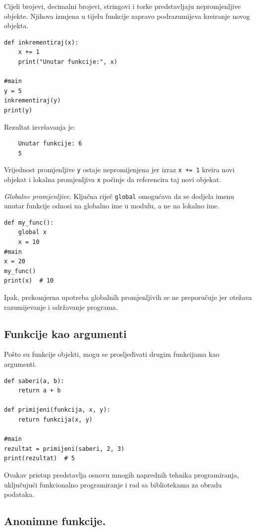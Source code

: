 Cijeli brojevi, decimalni brojevi, stringovi i torke predstavljaju nepromjenljive objekte. Njihova izmjena u tijelu funkcije zapravo podrazumijeva kreiranje novog objekta.

\begin{verbatim}
def inkrementiraj(x):
    x += 1
    print("Unutar funkcije:", x)

#main
y = 5   
inkrementiraj(y)
print(y)
\end{verbatim}

Rezultat izvršavanja je:
\begin{verbatim}
	Unutar funkcije: 6
	5
\end{verbatim}

Vrijednost promjenljive \texttt{y} ostaje nepromijenjena jer izraz \texttt{x += 1} kreira novi objekat i lokalna promjenljiva \texttt{x} počinje da referencira taj novi objekat.

\textit{Globalne promjenljive}. Ključna riječ \texttt{global} omogućava da se dodjela imenu unutar funkcije odnosi na globalno ime u modulu, a ne na lokalno ime. 

\begin{verbatim}
def my_func():
    global x
    x = 10
#main
x = 20
my_func()
print(x)  # 10
\end{verbatim}
Ipak, prekomjerna upotreba globalnih promjenljivih se ne preporučuje jer otežava razumijevanje i održavanje programa.

\subsection{Funkcije kao argumenti}

Pošto su funkcije objekti, mogu se prosljeđivati drugim funkcijama kao argumenti.

\begin{verbatim}
def saberi(a, b):
    return a + b

def primijeni(funkcija, x, y):
    return funkcija(x, y)

#main
rezultat = primijeni(saberi, 2, 3)
print(rezultat)  # 5
\end{verbatim}

Ovakav pristup predstavlja osnovu mnogih naprednih tehnika programiranja, uključujući funkcionalno programiranje i rad sa bibliotekama za obradu podataka.


\subsection{Anonimne funkcije.} 

